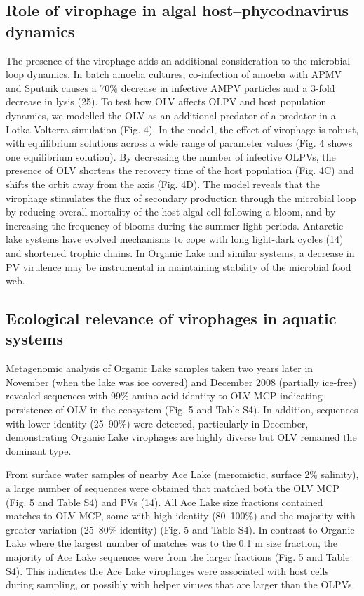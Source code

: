 \subsection[Virophage in algal host--phycodnavirus dynamics]{Role of virophage in algal host--phycodnavirus dynamics}
The presence of the virophage adds an additional consideration to the microbial loop dynamics. 
In batch amoeba cultures, co-infection of amoeba with APMV and Sputnik causes a 70\% decrease in infective AMPV particles and a 3-fold decrease in lysis (25). 
To test how OLV affects OLPV and host population dynamics, we modelled the OLV as an additional predator of a predator in a Lotka-Volterra simulation (Fig. 4). 
In the model, the effect of virophage is robust, with equilibrium solutions across a wide range of parameter values (Fig. 4 shows one equilibrium solution). 
By decreasing the number of infective OLPVs, the presence of OLV shortens the recovery time of the host population (Fig. 4C) and shifts the orbit away from the axis (Fig. 4D). 
The model reveals that the virophage stimulates the flux of secondary production through the microbial loop by reducing overall mortality of the host algal cell following a bloom, and by increasing the frequency of blooms during the summer light periods. 
Antarctic lake systems have evolved mechanisms to cope with long light-dark cycles (14) and shortened trophic chains. 
In Organic Lake and similar systems, a decrease in PV virulence may be instrumental in maintaining stability of the microbial food web. 

\subsection{Ecological relevance of virophages in aquatic systems}
Metagenomic analysis of Organic Lake samples taken two years later in November (when the lake was ice covered) and December 2008 (partially ice-free) revealed sequences with 99\% amino acid identity to OLV MCP indicating persistence of OLV in the ecosystem (Fig. 5 and Table S4). 
In addition, sequences with lower identity (25--90\%) were detected, particularly in December, demonstrating Organic Lake virophages are highly diverse but OLV remained the dominant type. 

From surface water samples of nearby Ace Lake (meromictic, surface 2\% salinity), a large number of sequences were obtained that matched both the OLV MCP (Fig. 5 and Table S4) and PVs (14). 
All Ace Lake size fractions contained matches to OLV MCP, some with high identity (80--100\%) and the majority with greater variation (25--80\% identity) (Fig. 5 and Table S4). 
In contrast to Organic Lake where the largest number of matches was to the 0.1 \textmu{}m size fraction, the majority of Ace Lake sequences were from the larger fractions (Fig. 5 and Table S4). 
This indicates the Ace Lake virophages were associated with host cells during sampling, or possibly with helper viruses that are larger than the OLPVs. 

